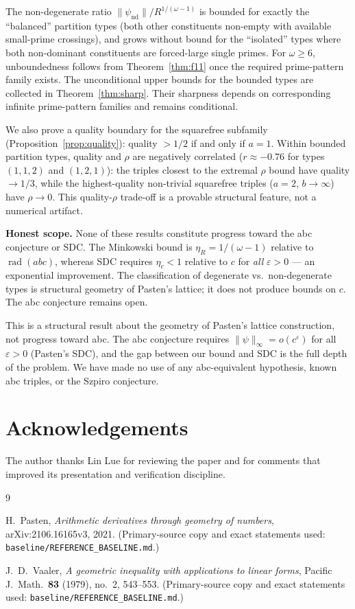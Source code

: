 \documentclass[12pt]{article}
\theoremstyle{definition}
\DeclareMathOperator{\rad}{rad}
\begin{document}
The non-degenerate ratio $\|\psi_{\text{nd}}\|/R^{1/(\omega-1)}$ is bounded for exactly
the ``balanced'' partition types (both other constituents non-empty with available small-prime
crossings), and grows without bound for the ``isolated'' types where both non-dominant
constituents are forced-large single primes.  For $\omega \ge 6$, unboundedness
follows from Theorem~\ref{thm:f11} once the required prime-pattern family exists.
The unconditional upper bounds for the bounded types are collected in
Theorem~\ref{thm:sharp}.  Their sharpness depends on corresponding infinite
prime-pattern families and remains conditional.

We also prove a quality boundary for the squarefree subfamily
(Proposition~\ref{prop:quality}): quality $> 1/2$ if and only if $a = 1$.
Within bounded partition types, quality and $\rho$ are negatively correlated
($r \approx -0.76$ for types $(1,1,2)$ and $(1,2,1)$): the triples
closest to the extremal $\rho$ bound have quality $\to 1/3$, while the highest-quality
non-trivial squarefree triples ($a=2$, $b\to\infty$) have $\rho \to 0$.
This quality-$\rho$ trade-off is a provable structural feature, not a numerical artifact.

\textbf{Honest scope.}
None of these results constitute progress toward the abc conjecture or SDC.
The Minkowski bound is $\eta_R = 1/(\omega-1)$ relative to $\rad(abc)$, whereas
SDC requires $\eta_c < 1$ relative to $c$ for \emph{all} $\varepsilon > 0$ --- an
exponential improvement.  The classification of degenerate vs.\ non-degenerate types
is structural geometry of Pasten's lattice; it does not produce bounds on $c$.
The abc conjecture remains open.

This is a structural result about the geometry of Pasten's lattice construction,
not progress toward abc.  The abc conjecture requires $\|\psi\|_\infty = o(c^\varepsilon)$
for all $\varepsilon>0$ (Pasten's SDC), and the gap between our bound and SDC is
the full depth of the problem.  We have made no use of any abc-equivalent
hypothesis, known abc triples, or the Szpiro conjecture.

\section*{Acknowledgements}
The author thanks Lin Lue for reviewing the paper and for comments that improved
its presentation and verification discipline.

{\sloppy\raggedright
\begin{thebibliography}{9}

H.~Pasten,
\emph{Arithmetic derivatives through geometry of numbers},
arXiv:2106.16165v3, 2021.
(Primary-source copy and exact statements used: \texttt{baseline/REFERENCE\_BASELINE.md}.)

J.~D.~Vaaler,
\emph{A geometric inequality with applications to linear forms},
Pacific J.\ Math.\ \textbf{83} (1979), no.~2, 543--553.
(Primary-source copy and exact statements used: \texttt{baseline/REFERENCE\_BASELINE.md}.)

\end{thebibliography}
}
\end{document}
